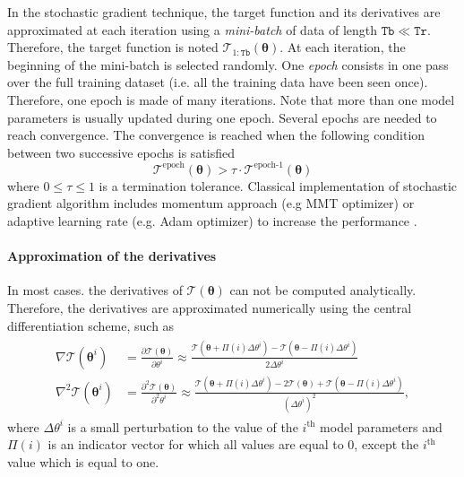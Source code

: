 In the stochastic gradient technique, the target function and its derivatives are approximated at each iteration using a \emph{mini-batch} of data of length $\mathtt{Tb} \ll \mathtt{Tr}$.
Therefore, the target function is noted $\mathcal{T}_{1:\mathtt{Tb}}(\bm{\theta})$.
At each iteration, the beginning of the mini-batch is selected randomly.
One \emph{epoch} consists in one pass over the full training dataset (i.e. all the training data have been seen once).
Therefore, one epoch is made of many iterations.
Note that more than one model parameters is usually updated during one epoch.
Several epochs are needed to reach convergence.
The convergence is reached when the following condition between two successive epochs is satisfied 
\begin{equation}
\mathcal{T}^{\text{epoch}} (\bm\theta) > \tau  \cdot \mathcal{T}^{\text{epoch-1}} (\bm\theta)
\label{EQ:SGT}
\end{equation}
where $0 \le \tau \le 1$ is a termination tolerance.
Classical implementation of stochastic gradient algorithm includes momentum approach (e.g MMT optimizer) or adaptive learning rate (e.g. Adam optimizer) to increase the performance \cite{Goodfellow-et-al-2016}.  

\paragraph{Approximation of the derivatives}

In most cases. the derivatives of $\mathcal{T}(\bm{\theta})$ can not be computed analytically.
Therefore, the derivatives are approximated numerically using the central differentiation scheme, such as
\begin{gather}
\begin{aligned}
 \nabla \mathcal{T}(\bm\theta^{i}) & = \frac{\partial \mathcal{T} (\bm\theta) }{\partial \theta^{i}} \approx \frac{\mathcal{T} (\bm\theta + \Pi(i)\Delta \theta^{i} )  -  \mathcal{T} (\bm\theta - \Pi(i)\Delta \theta^{i} ) }{2\Delta \theta^{i}}  \\
 \nabla^{2} \mathcal{T}(\bm\theta^{i}) & = \frac{\partial^{2} \mathcal{T} (\bm\theta) }{\partial^{2} \theta^{i}} \approx \frac{\mathcal{T} (\bm\theta + \Pi(i)\Delta \theta^{i} )  -  2 \mathcal{T} (\bm\theta) +  \mathcal{T} (\bm\theta - \Pi(i)\Delta \theta^{i} ) }{(\Delta \theta^{i})^{2}},
\label{EQ:numericaldiff}
\end{aligned}
\end{gather}
where $\Delta \theta^{i}$ is a small perturbation to the value of the $i^{\text{th}}$ model parameters and $\Pi(i)$ is an indicator vector for which all values are equal to $0$, except the $i^{\text{th}}$ value which is equal to one.



